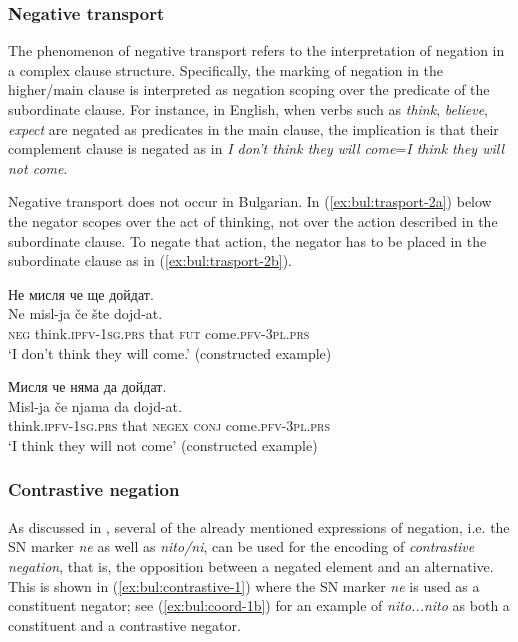 \documentclass[output=paper,colorlinks=true, citecolor=brown]{langscibook}
\begin{document}
\subsubsection{Negative transport} \label{sec:bul:neg-transport}
The phenomenon of negative transport refers to the interpretation of negation in a complex clause structure. Specifically,  the marking of negation in the higher/main clause is interpreted as negation scoping over the predicate of the subordinate clause. For instance, in English, when verbs such as \textit{think}, \textit{believe}, \textit{expect} are negated as predicates in the main clause, the implication is that their complement clause is negated as in \textit{I don't think they will come}=\textit{I think they will not come}.

Negative transport does not occur in Bulgarian. In (\ref{ex:bul:trasport-2a}) below the negator scopes over the act of thinking, not over the action described in the subordinate clause. To negate that action, the negator has to be placed in the subordinate clause as in (\ref{ex:bul:trasport-2b}).

\ea \label{ex:bul:trasport-2}
\ea Не мисля че ще дойдат.\\ \label{ex:bul:trasport-2a}
  	\gll Ne misl-ja če šte dojd-at.\\
     \textsc{neg} think.\textsc{ipfv}-\textsc{1sg.prs} that \textsc{fut} come.\textsc{pfv}-\textsc{3pl.prs}\\
\glt `I don't think they will come.' (constructed example) 

\ex Мисля че няма да дойдат.\\ \label{ex:bul:trasport-2b} 
  	\gll Misl-ja če njama da dojd-at.\\
     think.\textsc{ipfv}-\textsc{1sg.prs} that \textsc{negex} \textsc{conj} come.\textsc{pfv}-\textsc{3pl.prs}\\
\glt `I think they will not come' (constructed example) 
\z \z

\subsubsection{Contrastive negation} \label{sec:bul:contrastive_neg}
As discussed in , several of the already mentioned expressions of negation, i.e. the SN marker \textit{ne} as well as \textit{nito/ni}, can be used for the encoding of \textit{contrastive negation}, that is, the opposition between a negated element and an alternative. This is shown in (\ref{ex:bul:contrastive-1}) where the SN marker \textit{ne} is used as a constituent negator; see (\ref{ex:bul:coord-1b}) for an example of \textit{nito...nito} as both a constituent and a contrastive negator.
\end{document}
